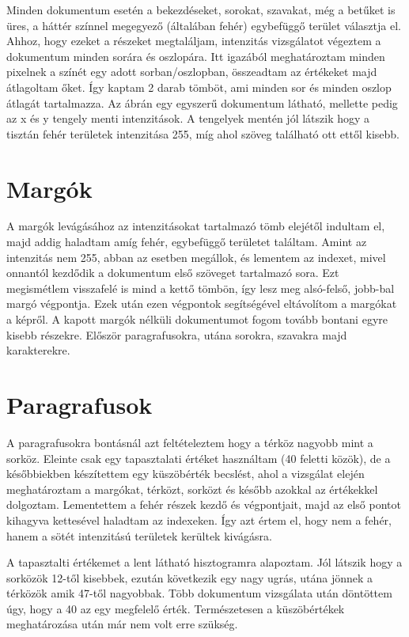 \documentclass{article}
\begin{document}
Minden dokumentum esetén a bekezdéseket, sorokat, szavakat, még a betűket is üres, a háttér színnel megegyező (általában fehér) egybefüggő terület választja el. Ahhoz, hogy ezeket a részeket megtaláljam, intenzitás vizsgálatot végeztem a dokumentum minden sorára és oszlopára. Itt igazából meghatároztam minden pixelnek a színét egy adott sorban/oszlopban, összeadtam az értékeket majd átlagoltam őket. Így kaptam 2 darab tömböt, ami minden sor és minden osz\-lop átlagát tartalmazza. Az ábrán egy egyszerű dokumentum látható, mellette pedig az x és y tengely menti intenzitások. A tengelyek mentén jól látszik hogy a tisztán fehér területek intenzitása 255, míg ahol szöveg található ott ettől kisebb.

\section{Margók}

A margók levágásához az intenzitásokat tartalmazó tömb elejétől indultam el, majd addig haladtam amíg fehér, egybefüggő területet találtam. Amint az intenzitás nem 255, abban az esetben megállok, és lementem az indexet, mivel onnantól kezdődik a dokumentum első szöveget tartalmazó sora. Ezt megismétlem visszafelé is mind a kettő tömbön, így lesz meg alsó-felső, jobb-bal margó végpontja. Ezek után ezen végpontok segítségével eltávolítom a margókat a képről. A kapott margók nélküli dokumentumot fogom tovább bontani egyre kisebb részekre. Először paragrafusokra, utána sorokra, szavakra majd karakterekre.

\section{Paragrafusok}

A paragrafusokra bontásnál azt feltételeztem hogy a térköz nagyobb mint a sorköz. Eleinte csak egy tapasztalati értéket használtam (40 feletti közök), de a későbbiekben készítettem egy küszöbérték becslést, ahol a vizsgálat elején meghatároztam a margókat, térközt, sorközt és később azokkal az értékekkel dolgoztam. Lementettem a fehér részek kezdő és végpontjait, majd az első pontot kihagyva kettesével haladtam az indexeken. Így azt értem el, hogy nem a fehér, hanem a sötét intenzitású területek kerültek kivágásra.

A tapasztalti értékemet a lent látható hisztogramra alapoztam. Jól látszik hogy a sorközök 12-től kisebbek, ezután következik egy nagy ugrás, utána jönnek a térközök amik 47-től nagyobbak. Több dokumentum vizsgálata után döntöttem úgy, hogy a 40 az egy megfelelő érték. Természetesen a küszöbértékek meghatározása után már nem volt erre szükség.
\end{document}
